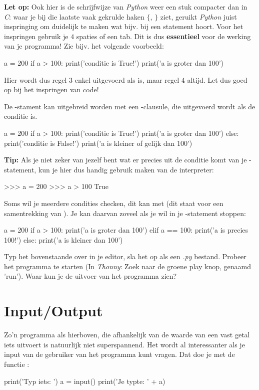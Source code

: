 \begin{remark}
\textbf{Let op:} Ook hier is de schrijfwijze van \textit{Python} weer een stuk compacter dan in \textit{C}: waar je bij die laatste vaak gekrulde haken $\{$, $\}$ ziet, geruikt \textit{Python} juist inspringing om duidelijk te maken wat bijv. bij een statement hoort. Voor het inspringen gebruik je $4$ spaties of een tab. Dit is dus \textbf{essentieel} voor de werking van je programma! Zie bijv. het volgende voorbeeld:
\begin{python}
a = 200
if a > 100:
	print('conditie is True!')
print('a is groter dan 100')
\end{python}
Hier wordt dus regel $3$ enkel uitgevoerd als  is, maar regel $4$ altijd. Let dus goed op bij het inspringen van code!
\end{remark}

De -stament kan uitgebreid worden met een -clausule, die uitgevoerd wordt als de conditie  is.
\begin{python}
a = 200
if a > 100:
	print('conditie is True!')
	print('a is groter dan 100')
else:
	print('conditie is False!')
	print('a is kleiner of gelijk dan 100')
\end{python}

\newpage

\textbf{Tip:} Als je niet zeker van jezelf bent wat er precies uit de conditie komt van je -statement, kun je hier dus handig gebruik maken van de interpreter:
\begin{python}
>>> a = 200
>>> a > 100
True
\end{python}

Soms wil je meerdere condities checken, dit kan met  (dit staat voor een samentrekking van ). Je kan daarvan zoveel als je wil in je -statement stoppen:
\begin{python}
a = 200
if a > 100:
	print('a is groter dan 100')
elif a == 100:
	print('a is precies 100!')
else:
	print('a is kleiner dan 100')
\end{python}
\begin{exercise}
Typ het bovenstaande over in je editor, sla het op als een \textit{.py} bestand. Probeer het programma te starten (In \textit{Thonny}: Zoek naar de groene play knop, genaamd 'run'). Waar kun je de uitvoer van het programma zien?
\end{exercise}

\section{Input/Output}
Zo'n programma als hierboven, die afhankelijk van de waarde van een vast getal iets uitvoert is natuurlijk niet superspannend. Het wordt al interessanter als je input van de gebruiker van het programma kunt vragen. Dat doe je met de functie :
\begin{python}
print('Typ iets: ')
a = input()
print('Je typte: ' + a)
\end{python}


